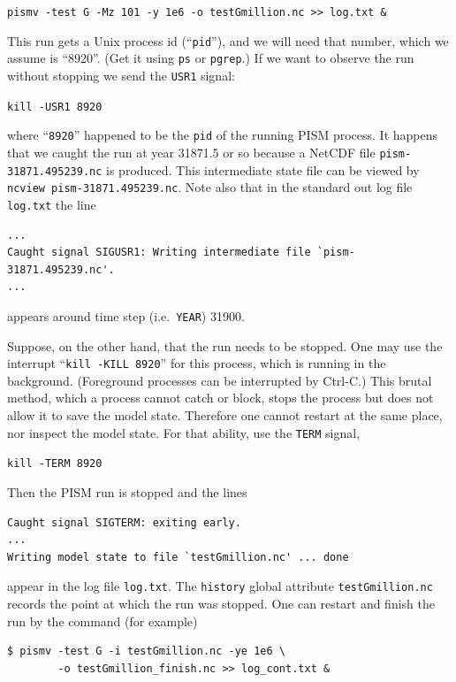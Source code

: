 \documentclass[11pt,final]{amsart}
\begin{document}
\verb|pismv -test G -Mz 101 -y 1e6 -o testGmillion.nc >> log.txt &|

\noindent This run gets a Unix process id (``\verb|pid|''), and we will need that number, which we assume is ``8920''.  (Get it using \verb|ps| or \verb|pgrep|.)  If we want to observe the run without stopping we send the \verb|USR1| signal:

\verb|kill -USR1 8920|

\noindent where ``\verb|8920|'' happened to be the \verb|pid| of the running PISM process.  It happens that we caught the run at year 31871.5 or so because a NetCDF file \verb|pism-31871.495239.nc| is produced.  This intermediate state file can be viewed by \verb|ncview pism-31871.495239.nc|.  Note also that in the standard out log file \verb|log.txt| the line

\begin{verbatim}
...
Caught signal SIGUSR1: Writing intermediate file `pism-31871.495239.nc'.
...
\end{verbatim}
\noindent appears around time step (i.e.~\verb|YEAR|) 31900.

Suppose, on the other hand, that the run needs to be stopped.  One may use the interrupt ``\verb|kill -KILL 8920|'' for this process, which is running in the background.  (Foreground processes can be interrupted by Ctrl-C.)  This brutal method, which a process cannot catch or block, stops the process but does not allow it to save the model state.  Therefore one cannot restart at the same place, nor inspect the model state.  For that ability, use the \verb|TERM| signal,

\verb|kill -TERM 8920|

\noindent Then the PISM run is stopped and the lines
\begin{verbatim}
Caught signal SIGTERM: exiting early.
...
Writing model state to file `testGmillion.nc' ... done
\end{verbatim}
\noindent appear in the log file \verb|log.txt|.  The \verb|history| global attribute \verb|testGmillion.nc| records the point at which the run was stopped.  One can restart and finish the run by the command (for example)

\begin{verbatim}
$ pismv -test G -i testGmillion.nc -ye 1e6 \
        -o testGmillion_finish.nc >> log_cont.txt &
\end{verbatim}
\end{document}
